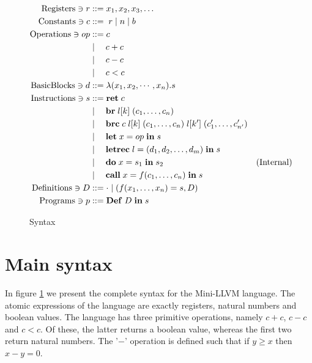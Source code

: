 \documentclass[a4paper, oneside, 10pt, draft]{memoir}
\begin{document}
\newcommand{\ibr}[2]{\mathbf{br} \; #1 \; #2}
\newcommand{\ibrc}[5]{\mathbf{brc} \; #1 \; #2 \; #3 \; #4 \; #5}
\newcommand{\ilet}[3]{\mathbf{let} \; #1 = #2 \; \mathbf{in} \; #3}
\newcommand{\iletrec}[3]{\mathbf{letrec} \; #1 = #2 \; \mathbf{in} \; #3}
\newcommand{\ido}[3]{\mathbf{do} \; #1 = #2 \; \mathbf{in} \; #3}
\newcommand{\icall}[4]{\mathbf{call} \; #1 = #2 #3\; \mathbf{in} \;
  #4}
\newcommand{\ipgm}[2]{\mathbf{Def} \; #1 \; \mathbf{in} \; #2}
\begin{figure}
  \begin{align*}
    \registers \ni r & ::= x_1, x_2, x_3, \dotsc\\
    \constants \ni c & ::= \; r \bor \nat \bor \bool \\
    \operations \ni op & ::= c \\
                       & \bor \quad c + c \\
                       & \bor \quad c - c \\
                       & \bor \quad c < c \\
   \basicblocks \ni d  & ::= \lambda (x_1, x_2, \cdots, x_n) . s\\
   \instructions \ni s & ::= \iret{c} \\
                       & \bor \quad \ibr{\lbl{k}}{(c_1, \dotsc, c_n)} \\
                       & \bor \quad \ibrc{c}{\lbl{k}}{(c_1, \dotsc, c_n)}{\lbl{{k'}}}{(c'_1, \dotsc, c'_{n'})}\\
                       & \bor \quad \ilet{x}{op}{s} \\
                       & \bor \quad \iletrec{l}{\dbundle}{s} \\
                       & \bor \quad \ido{x}{s_1}{s_2} &
                       (\text{Internal})\\
                       & \bor \quad \icall{x}{f}{(c_1, \dotsc,
                         c_n)}{s}\\
    \definitions \ni D & ::= \cdot \bor (f(x_1, \dotsc, x_n) = s, D)\\
    \programs \ni p & ::= \ipgm{D}{s}
  \end{align*}
  \caption{Syntax}
  \label{fig:syntax}
\end{figure}

\section{Main syntax}

In figure \ref{fig:syntax} we present the complete syntax for the
Mini-LLVM language. The atomic expressions of the language are exactly
registers, natural numbers and boolean values. The language has three
primitive operations, namely $c + c$, $c - c$ and $c < c$. Of these,
the latter returns a boolean value, whereas the first two return
natural numbers. The '$-$' operation is defined such that if $y \geq
x$ then $x - y = 0$.
\end{document}
